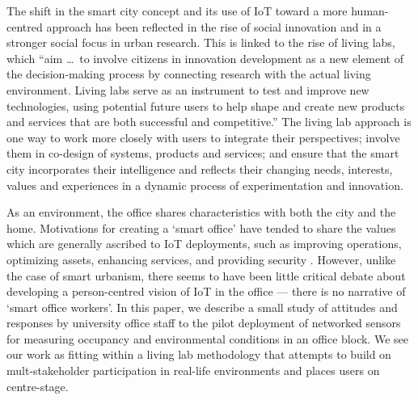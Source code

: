 The shift in the smart city concept and its use of IoT toward a more
human-centred approach \cite{Shin-2017-UTIO} has been reflected in the rise of social
innovation and in a stronger social focus in urban research. This is
linked to the rise of living labs, which “aim \ldots\ to involve citizens
in innovation development as a new element of the decision-making
process by connecting research with the actual living
environment. Living labs serve as an instrument to test and improve
new technologies, using potential future users to help shape and
create new products and services that are both successful and
competitive.”\cite{Franz-2015-DSLL}  The living lab approach is one way to work more closely
with users to integrate their perspectives; involve them in co-design
of systems, products and services; and ensure that the smart city
incorporates their intelligence and reflects their changing needs,
interests, values and experiences in a dynamic process of
experimentation and innovation.

As an environment, the office shares characteristics with both the
city and the home. Motivations for creating a `smart office' have
tended to share the values which are generally ascribed to IoT
deployments, such as improving operations, optimizing assets, enhancing
services, and providing security
\cite{Heidt-2016-PGFT,Gaur-2015-SCAA,Gubbi-2013-IOT}. However, unlike
the case of smart urbanism, there seems to have been little
critical debate about developing a person-centred vision of IoT in the
office --- there is no narrative of `smart office workers'.  In this
paper, we describe a small study of attitudes and responses by university office
staff to the pilot deployment of networked sensors for measuring
occupancy and environmental conditions in an office block. 
We see our work as fitting within a living lab methodology that
attempts to build on mult-stakeholder participation in real-life
environments and places users on centre-stage.
 





